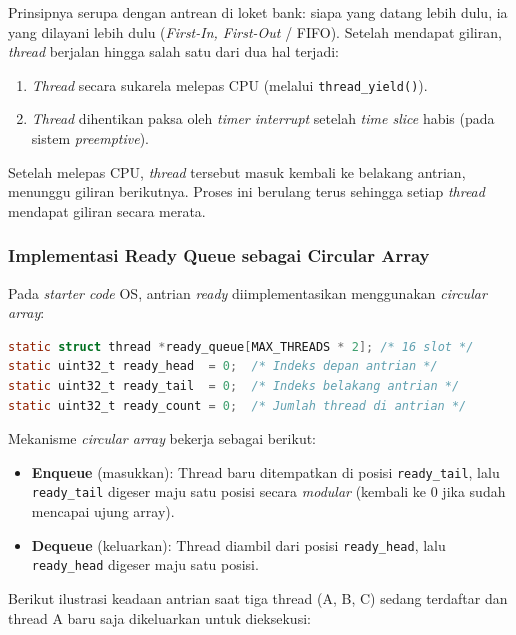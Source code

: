 Prinsipnya serupa dengan antrean di loket bank: siapa yang datang lebih dulu, ia yang dilayani lebih dulu (\textit{First-In, First-Out} / FIFO). Setelah mendapat giliran, \textit{thread} berjalan hingga salah satu dari dua hal terjadi:
\begin{enumerate}
	\item \textit{Thread} secara sukarela melepas CPU (melalui \texttt{thread\_yield()}).
	\item \textit{Thread} dihentikan paksa oleh \textit{timer interrupt} setelah \textit{time slice} habis (pada sistem \textit{preemptive}).
\end{enumerate}

Setelah melepas CPU, \textit{thread} tersebut masuk kembali ke belakang antrian, menunggu giliran berikutnya. Proses ini berulang terus sehingga setiap \textit{thread} mendapat giliran secara merata.

\subsubsection{Implementasi Ready Queue sebagai Circular Array}
Pada \textit{starter code} OS, antrian \textit{ready} diimplementasikan menggunakan \textit{circular array}:

\begin{lstlisting}[language=C, caption={Variabel antrian thread pada thread.c}]
static struct thread *ready_queue[MAX_THREADS * 2]; /* 16 slot */
static uint32_t ready_head  = 0;  /* Indeks depan antrian */
static uint32_t ready_tail  = 0;  /* Indeks belakang antrian */
static uint32_t ready_count = 0;  /* Jumlah thread di antrian */
\end{lstlisting}

Mekanisme \textit{circular array} bekerja sebagai berikut:
\begin{itemize}
	\item \textbf{Enqueue} (masukkan): Thread baru ditempatkan di posisi \texttt{ready\_tail}, lalu \texttt{ready\_tail} digeser maju satu posisi secara \textit{modular} (kembali ke 0 jika sudah mencapai ujung array).
	\item \textbf{Dequeue} (keluarkan): Thread diambil dari posisi \texttt{ready\_head}, lalu \texttt{ready\_head} digeser maju satu posisi.
\end{itemize}

Berikut ilustrasi keadaan antrian saat tiga thread (A, B, C) sedang terdaftar dan thread A baru saja dikeluarkan untuk dieksekusi:

